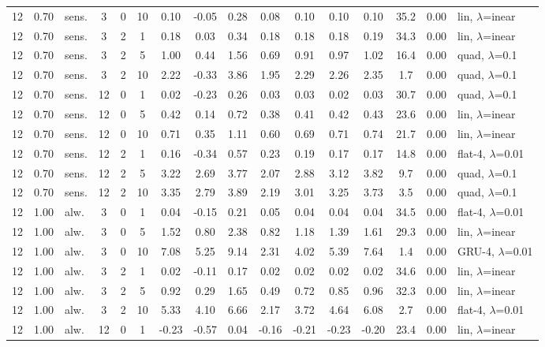 \begin{scriptsize}
\begin{longtable}{cclcc c ccc ccc c cc l}
12 & 0.70 & sens. & 3 & 0 & 10 & 0.10 & -0.05 & 0.28 & 0.08 & 0.10 & 0.10 & 0.10 & 35.2 & 0.00 & lin, $\lambda$=inear \\
12 & 0.70 & sens. & 3 & 2 & 1 & 0.18 & 0.03 & 0.34 & 0.18 & 0.18 & 0.18 & 0.19 & 34.3 & 0.00 & lin, $\lambda$=inear \\
12 & 0.70 & sens. & 3 & 2 & 5 & 1.00 & 0.44 & 1.56 & 0.69 & 0.91 & 0.97 & 1.02 & 16.4 & 0.00 & quad, $\lambda$=0.1 \\
12 & 0.70 & sens. & 3 & 2 & 10 & 2.22 & -0.33 & 3.86 & 1.95 & 2.29 & 2.26 & 2.35 & 1.7 & 0.00 & quad, $\lambda$=0.1 \\
12 & 0.70 & sens. & 12 & 0 & 1 & 0.02 & -0.23 & 0.26 & 0.03 & 0.03 & 0.02 & 0.03 & 30.7 & 0.00 & quad, $\lambda$=0.1 \\
12 & 0.70 & sens. & 12 & 0 & 5 & 0.42 & 0.14 & 0.72 & 0.38 & 0.41 & 0.42 & 0.43 & 23.6 & 0.00 & lin, $\lambda$=inear \\
12 & 0.70 & sens. & 12 & 0 & 10 & 0.71 & 0.35 & 1.11 & 0.60 & 0.69 & 0.71 & 0.74 & 21.7 & 0.00 & lin, $\lambda$=inear \\
12 & 0.70 & sens. & 12 & 2 & 1 & 0.16 & -0.34 & 0.57 & 0.23 & 0.19 & 0.17 & 0.17 & 14.8 & 0.00 & flat-4, $\lambda$=0.01 \\
12 & 0.70 & sens. & 12 & 2 & 5 & 3.22 & 2.69 & 3.77 & 2.07 & 2.88 & 3.12 & 3.82 & 9.7 & 0.00 & quad, $\lambda$=0.1 \\
12 & 0.70 & sens. & 12 & 2 & 10 & 3.35 & 2.79 & 3.89 & 2.19 & 3.01 & 3.25 & 3.73 & 3.5 & 0.00 & quad, $\lambda$=0.1 \\
12 & 1.00 & alw. & 3 & 0 & 1 & 0.04 & -0.15 & 0.21 & 0.05 & 0.04 & 0.04 & 0.04 & 34.5 & 0.00 & flat-4, $\lambda$=0.01 \\
12 & 1.00 & alw. & 3 & 0 & 5 & 1.52 & 0.80 & 2.38 & 0.82 & 1.18 & 1.39 & 1.61 & 29.3 & 0.00 & lin, $\lambda$=inear \\
12 & 1.00 & alw. & 3 & 0 & 10 & 7.08 & 5.25 & 9.14 & 2.31 & 4.02 & 5.39 & 7.64 & 1.4 & 0.00 & GRU-4, $\lambda$=0.01 \\
12 & 1.00 & alw. & 3 & 2 & 1 & 0.02 & -0.11 & 0.17 & 0.02 & 0.02 & 0.02 & 0.02 & 34.6 & 0.00 & lin, $\lambda$=inear \\
12 & 1.00 & alw. & 3 & 2 & 5 & 0.92 & 0.29 & 1.65 & 0.49 & 0.72 & 0.85 & 0.96 & 32.3 & 0.00 & lin, $\lambda$=inear \\
12 & 1.00 & alw. & 3 & 2 & 10 & 5.33 & 4.10 & 6.66 & 2.17 & 3.72 & 4.64 & 6.08 & 2.7 & 0.00 & flat-4, $\lambda$=0.01 \\
12 & 1.00 & alw. & 12 & 0 & 1 & -0.23 & -0.57 & 0.04 & -0.16 & -0.21 & -0.23 & -0.20 & 23.4 & 0.00 & lin, $\lambda$=inear \\

\end{longtable}
\end{scriptsize}
